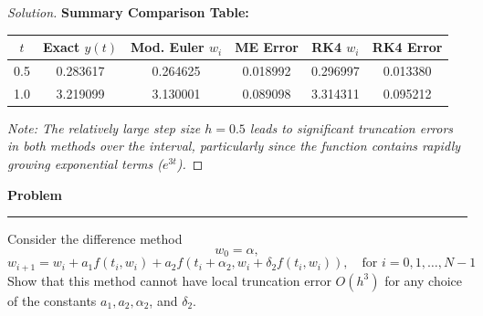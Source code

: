 \documentclass[11pt, a4paper]{article}
\newenvironment{problem}{%
  \begin{tcolorbox}[
    colback=blue!4!white,
    colframe=blue!38!black,
    boxrule=0.95pt,
    arc=3pt,
    left=11pt,
    right=11pt,
    top=10pt,
    bottom=11pt,
    before skip=12pt,
    after skip=14pt,
  ]
  \noindent\textbf{\textcolor{blue!35!black}{Problem}}\par\nointerlineskip
  {\color{blue!42!black}\rule{\linewidth}{0.55pt}}\par\vspace{0.55em}%
}{%
  \end{tcolorbox}%
}
\newif\ifsolutionnewpage
\newenvironment{solution}
  {\begin{proof}[Solution]}
  {\end{proof}\ifsolutionnewpage\newpage\fi}
\begin{document}
\begin{solution}
        \textbf{Summary Comparison Table:}
        \begin{center}
        \begin{tabular}{| c | c | c | c | c | c |}
        \hline
        $t$ & Exact $y(t)$ & Mod. Euler $w_i$ & ME Error & RK4 $w_i$ & RK4 Error \\
        \hline
        0.5 & 0.283617 & 0.264625 & 0.018992 & 0.296997 & 0.013380 \\
        1.0 & 3.219099 & 3.130001 & 0.089098 & 3.314311 & 0.095212 \\
        \hline
        \end{tabular}
        \end{center}
        \textit{Note: The relatively large step size $h=0.5$ leads to significant truncation errors in both methods over the interval, particularly since the function contains rapidly growing exponential terms ($e^{3t}$).}
        \end{solution}

        \begin{problem}
            Consider the difference method
            \begin{equation*}
            w_0 = \alpha,
            \end{equation*}
            \begin{equation*}
            w_{i+1} = w_i + a_1 f(t_i, w_i) + a_2 f(t_i + \alpha_2, w_i + \delta_2 f(t_i, w_i)), \quad \text{for } i = 0, 1, \dots, N-1
            \end{equation*}
            Show that this method cannot have local truncation error $O(h^3)$ for any choice of the constants $a_1, a_2, \alpha_2$, and $\delta_2$.
            \end{problem}
            
\end{document}
